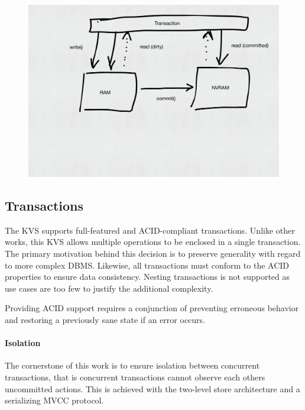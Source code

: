 \begin{figure}[h!]
    \centering
    \includegraphics[width=\textwidth]{figures/drafts/concept-sys-two-level-store.pdf}
    \caption{}
    \label{fig:concept-two-level-store}
\end{figure}


\subsection{Transactions}

The \ac{KVS} supports full-featured and ACID-compliant transactions. Unlike
other works, this \ac{KVS} allows multiple operations to be enclosed in a single
transaction. The primary motivation behind this decision is to preserve
generality with regard to more complex \ac{DBMS}. Likewise, all transactions
must conform to the ACID properties to ensure data consistency. Nesting
transactions is not supported as use cases are too few to justify the additional
complexity.

Providing ACID support requires a conjunction of preventing erroneous behavior
and restoring a previously sane state if an error occurs.

\paragraph{Isolation}

The cornerstone of this work is to ensure isolation between concurrent
transactions, that is concurrent transactions cannot observe each others
uncommitted actions. This is achieved with the two-level store architecture and
a serializing \ac{MVCC} protocol.

